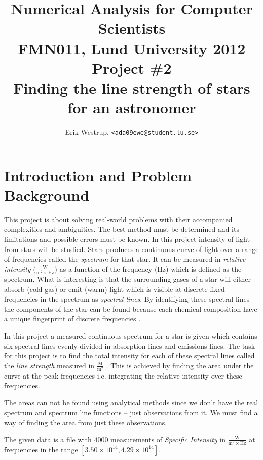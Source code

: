 \documentclass[10pt, a4paper]{article}
\title{Numerical Analysis for Computer Scientists\\ FMN011, Lund University 2012\\ Project \#2\\ Finding the line strength of stars for an astronomer}
\date{}
\author{Erik Westrup, \texttt{<ada09ewe@student.lu.se>}}
\begin{document}
\begin{titlepage}
\maketitle

\thispagestyle{empty}
\end{titlepage}
\setcounter{page}{2}

\section{Introduction and Problem Background}
This project is about solving real-world problems with their accompanied complexities and ambiguities. The best method must be determined and its limitations and possible errors must be known. In this project intensity of light from stars will be studied. Stars produces a continuous curve of light over a range of frequencies called the \emph{spectrum} for that star. It can be measured in \emph{relative intensity} ($\frac{\mathrm{W}}{\mathrm{m}^2\times\mathrm{Hz}}$) as a function of the frequency (Hz) which is defined as the spectrum. What is interesting is that the surrounding gases of a star will either absorb (cold gas) or emit (warm) light which is visible at discrete fixed frequencies in the spectrum as \emph{spectral lines}. By identifying these spectral lines the components of the star can be found  because each chemical composition have a unique fingerprint of discrete frequencies \cite{astronotes1} \cite{astronotes2}. %

In this project a measured continuous spectrum for a star is given which contains six spectral lines evenly divided in absorption lines and emissions lines. The task for this project is to find the total intensity for each of these spectral lines called the \emph{line strength} measured in $\frac{\mathrm{M}}{\mathrm{m}^2}$ \cite{linestrength}. This is achieved by finding the area under the curve at the peak-frequencies i.e. integrating the relative intensity over these frequencies. %

The areas can not be found using analytical methods since we don't have the real spectrum and spectrum line functions -- just observations from it. We must find a way of finding the area from just these observations.

The given data is a file with $4000$ measurements of \emph{Specific Intensity} in $\frac{\mathrm{W}}{\mathrm{m}^2\times \mathrm{Hz}}$ at frequencies in the range $[3.50\times10^{14}, 4.29\times10^{14}]$.
\end{document}
